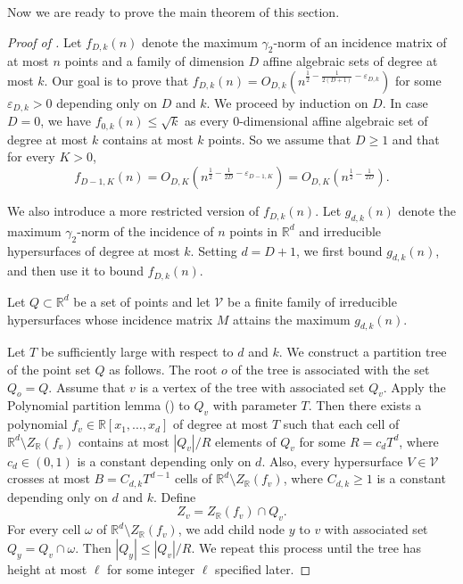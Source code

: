 \documentclass[11pt]{article}
\theoremstyle{plain}
\theoremstyle{definition}
\newcommand{\eps}{\varepsilon}
\begin{document}
	Now we are ready to prove the main theorem of this section.
\begin{proof}[Proof of ]
		Let $f_{D,k}(n)$ denote the maximum $\gamma_2$-norm of an incidence matrix of at most $n$ points and a family of dimension $D$ affine algebraic sets of degree at most $k$. Our goal is to prove that $f_{D,k}(n)=O_{D,k}(n^{\frac{1}{2}-\frac{1}{2(D+1)}-\eps_{D,k}})$ for some $\eps_{D,k}>0$ depending only on $D$ and $k$. We proceed by induction on $D$. In case $D=0$, we have $f_{0,k}(n)\leq \sqrt{k}$ as every 0-dimensional affine algebraic set of degree at most $k$ contains at most $k$ points. So we assume that $D\geq 1$ and that for every $K>0$, $$f_{D-1,K}(n)=O_{D,K}(n^{\frac{1}{2}-\frac{1}{2D}-\eps_{D-1,K}})=O_{D,K}(n^{\frac{1}{2}-\frac{1}{2D}}).$$
		
		We also introduce a more restricted version of $f_{D,k}(n)$. Let $g_{d,k}(n)$ denote the maximum $\gamma_2$-norm of the incidence of $n$ points in $\mathbb{R}^d$ and irreducible hypersurfaces of degree at most $k$. Setting $d=D+1$, we first bound $g_{d,k}(n)$, and then use it to bound $f_{D,k}(n)$.
		
		
		Let $Q\subset \mathbb{R}^d$ be a set of points and let $\mathcal{V}$ be a finite family of irreducible hypersurfaces whose incidence matrix $M$ attains the maximum $g_{d,k}(n)$. 
		
		Let $T$ be sufficiently large with respect to $d$ and $k$. We construct a partition tree of the point set $Q$ as follows. The root $o$ of the tree is associated with the set $Q_{o}=Q$. Assume that $v$ is a vertex of the tree with associated set $Q_v$. Apply the Polynomial partition lemma  () to $Q_v$ with parameter $T$. Then there exists a polynomial   $f_v\in \mathbb{R}[x_1,\dots,x_d]$ of degree at most $T$ such that each cell of $\mathbb{R}^d\setminus Z_{\mathbb{R}}(f_v)$ contains at most $|Q_v|/R$ elements of $Q_v$ for some $R=c_dT^d$, where $c_d\in (0,1)$ is a constant depending only on $d$. Also, every hypersurface $V\in \mathcal{V}$ crosses at most $B=C_{d,k}T^{d-1}$ cells of $\mathbb{R}^d\setminus Z_{\mathbb{R}}(f_v)$, where $C_{d,k}\geq 1$ is a constant depending only on $d$ and $k$. Define
		$$Z_v=Z_{\mathbb{R}}(f_v)\cap Q_v.$$
		For every cell $\omega$ of $\mathbb{R}^d\setminus Z_{\mathbb{R}}(f_v)$, we add child node $y$ to $v$ with associated set $Q_y=Q_v\cap \omega$. Then $|Q_y|\leq |Q_v|/R$. We repeat this process until the tree has height at most $\ell$ for some integer $\ell$ specified later.
		

\end{proof}
\end{document}
